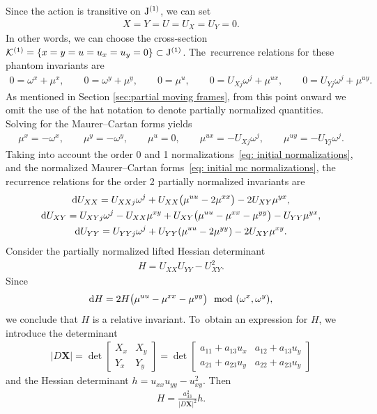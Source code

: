 \documentclass[10pt,a4paper]{amsart}
\numberwithin{equation}{section}
\newcommand{\J}{{\rm J}}
\newcommand{\vX}{\mathbf{X}}
\begin{document}
Since the action is transitive on $\J^{(1)}$, we can set
%
\begin{gather}\label{eq: initial normalizations}
X = Y = U = U_X = U_Y = 0.
\end{gather}
%
In other words, we can choose the cross-section $\mathcal{K}^{(1)}=\{x=y=u=u_x=u_y=0\}\subset \J^{(1)}$. The~recurrence relations for these phantom invariants are
\begin{gather*}
0 = \omega^x + \mu^x,\qquad
0 = \omega^y + \mu^y,\qquad
0 = \mu^u,\qquad
0 = U_{Xj} \omega^j + \mu^{ux},\qquad
0 = U_{Yj} \omega^j + \mu^{uy}.
\end{gather*}
As mentioned in Section \ref{sec:partial moving frames}, from this point onward we omit the use of the hat notation to denote partially normalized quantities. Solving for the Maurer--Cartan forms yields
%
\begin{gather}\label{eq: initial mc normalizations}
\mu^x = -\omega^x,\qquad \mu^y = -\omega^y,\qquad \mu^u = 0,\qquad
\mu^{ux} = -U_{Xj} \omega^j,\qquad \mu^{uy} = -U_{Yj} \omega^j.
\end{gather}
%
Taking into account the order 0 and 1 normalizations~\eqref{eq: initial normalizations}, and the normalized Maurer--Cartan forms~\eqref{eq: initial mc normalizations}, the recurrence relations for the order 2 partially normalized invariants are
%
\begin{gather}
{\rm d}U_{XX} = U_{XXj} \omega^j + U_{XX}\big(\mu^{uu} - 2\mu^{xx}\big) - 2U_{XY} \mu^{yx},\nonumber
\\
{\rm d}U_{XY} = U_{XYj} \omega^j - U_{XX}\mu^{xy} + U_{XY}\big(\mu^{uu} - \mu^{xx} - \mu^{yy}\big) - U_{YY}\mu^{yx},\nonumber
\\
{\rm d}U_{YY} = U_{YYj} \omega^j + U_{YY}(\mu^{uu}-2\mu^{yy}) - 2U_{XY}\mu^{xy}.
\label{eq: order 2 recurrence relations}
\end{gather}
%
Consider the partially normalized lifted Hessian determinant
\begin{gather*}
H=U_{XX}U_{YY} - U_{XY}^2.
\end{gather*}
Since
\begin{gather*}
{\rm d}H = 2 H\big(\mu^{uu} - \mu^{xx} - \mu^{yy}\big) \mod(\omega^x,\omega^y),
\end{gather*}
we conclude that $H$ is a relative invariant. To~obtain an expression for $H$, we introduce the determinant
%
\begin{gather}\label{eq:det}
|D\vX| = \det
\begin{bmatrix}
X_x & X_y \\
Y_x & Y_y
\end{bmatrix} = \det
\begin{bmatrix}
a_{11} + a_{13} u_x & a_{12} + a_{13} u_y \\
a_{21} + a_{23} u_y & a_{22} + a_{23} u_y
\end{bmatrix}
\end{gather}
%
and the Hessian determinant $h=u_{xx} u_{yy} - u_{xy}^2$. Then
\begin{gather*}
H = \frac{a_{33}^2}{|D\vX|^2} h.
\end{gather*}
\end{document}
